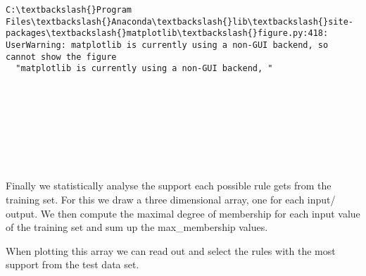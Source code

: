 \documentclass[11pt]{article}
\begin{document}
    \begin{Verbatim}[commandchars=\\\{\}]
C:\textbackslash{}Program Files\textbackslash{}Anaconda\textbackslash{}lib\textbackslash{}site-packages\textbackslash{}matplotlib\textbackslash{}figure.py:418: UserWarning: matplotlib is currently using a non-GUI backend, so cannot show the figure
  "matplotlib is currently using a non-GUI backend, "

    \end{Verbatim}

    \begin{center}
    \end{center}
    { \hspace*{\fill} \\}
    
    \begin{center}
    \end{center}
    { \hspace*{\fill} \\}
    
    \begin{center}
    \end{center}
    { \hspace*{\fill} \\}
    
    \begin{center}
    \end{center}
    { \hspace*{\fill} \\}
    
    Finally we statistically analyse the support each possible rule gets
from the training set. For this we draw a three dimensional array, one
for each input/ output. We then compute the maximal degree of membership
for each input value of the training set and sum up the max\_membership
values.

When plotting this array we can read out and select the rules with the
most support from the test data set.
\end{document}
